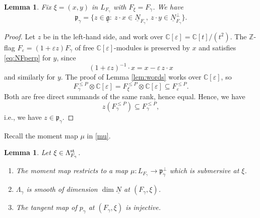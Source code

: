 \documentclass[11pt,reqno]{amsart}
\newtheorem{Lemma}[Theorem]{Lemma}
\theoremstyle{definition}
\theoremstyle{remark}
\def\bbC{\mathbb C}
\def\bbZ{\mathbb Z}
\def\dN{\underline N}
\def\dg{\underline{\mathfrak g}}
\def\frakp{\mathfrak p}
\begin{document}
\begin{Lemma}\label{lem:IU}
Fix $\xi=(x,y)$ in $L_{F_\gamma}$ with $F_\xi=F_\gamma$. We have
\begin{equation}\label{eq:IU}
\frakp_\gamma=\{z\in\dg:\ z\cdot x\in\dN_{F_\gamma},\ z\cdot y\in\dN_{F_\gamma}^\perp\}.
\end{equation}
\end{Lemma}

\begin{proof}
Let $z$ be in the left-hand side, and work over $\bbC[\varepsilon]=\bbC[t]/(t^2)$. 
The $\bbZ$-flag $F_\varepsilon=(1+\varepsilon z)F_\gamma$ of free
$\bbC[\varepsilon]$-modules is preserved by $x$ and satisfies \eqref{eq:NFperp} for $y$, 
since 
$$(1+\varepsilon z)^{-1}\cdot x=x-\varepsilon\,z\cdot x$$
and similarly for $y$. 
The proof of Lemma \ref{lem:words} works over $\bbC[\varepsilon]$, so 
$$F_\gamma^{\leqslant P}\otimes\bbC[\varepsilon]=F_\xi^{\leqslant P}\otimes\bbC[\varepsilon]\subseteq
F_\varepsilon^{\leqslant P}.$$ 
Both are free direct summands of the same rank, hence equal.
Hence, we have 
$$z(F_\gamma^{\leqslant P})\subseteq F_\gamma^{\leqslant P},$$ 
i.e., we have
$z\in\frakp_\gamma$.
\end{proof}

Recall the moment map $\mu$ in \eqref{mu}. 

\begin{Lemma}\label{lem:smooth}
Let $\xi\in\Lambda_{F_\gamma}^{\rm st}$. 
\begin{enumerate}[label=$\mathrm{(\alph*)}$,leftmargin=8mm]
\item
The moment map restricts to a map
$\mu:L_{F_\gamma}\to\frakp_\gamma^\perp$ 
which is submersive at $\xi$.
\item
$\Lambda_\gamma$ is smooth of dimension $\dim\dN$ at $(F_\gamma,\xi)$.
\item
The tangent map of $p_\gamma$ at $(F_\gamma,\xi)$ is injective.
\end{enumerate}
\end{Lemma}
\end{document}
